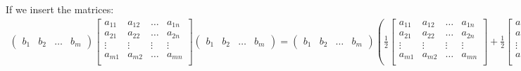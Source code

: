 \documentclass[12pt]{article}
\begin{document}
\begin{enumerate}
    If we insert the matrices:
    \begin{align*}
        \begin{pmatrix}
            b_1     &
            b_2     &
            \dots  &
            b_m
        \end{pmatrix} 
        \begin{bmatrix}
            a_{11}    &   a_{12}    & \dots     &   a_{1n}    \\
            a_{21}    &   a_{22}    & \dots     &   a_{2n}    \\
            \vdots    &  \vdots     & \vdots    &   \vdots    \\   
            a_{m1}    &   a_{m2}    & \dots     &   a_{mn}    \\
        \end{bmatrix}
        \begin{pmatrix}
            b_1     &
            b_2     &
            \dots  &
            b_m
        \end{pmatrix}
        = 
        \begin{pmatrix}
            b_1     &
            b_2     &
            \dots  &
            b_m
        \end{pmatrix} (\frac{1}{2} 
        \begin{bmatrix}
            a_{11}    &   a_{12}    & \dots     &   a_{1n}    \\
            a_{21}    &   a_{22}    & \dots     &   a_{2n}    \\
            \vdots    &  \vdots     & \vdots    &   \vdots    \\   
            a_{m1}    &   a_{m2}    & \dots     &   a_{mn}    \\
        \end{bmatrix}
         + \frac{1}{2}
        \begin{bmatrix}
            a_{11}    &   a_{21}    & \dots     &   a_{m1}    \\
            a_{12}    &   a_{22}    & \dots     &   a_{2n}    \\
            \vdots    &  \vdots     & \vdots    &   \vdots    \\   
            a_{1n}    &   a_{2n}    & \dots     &   a_{mn}    \\
        \end{bmatrix})
        \begin{pmatrix}
            b_1     &
            b_2     &
            \dots  &
            b_m
        \end{pmatrix}
    \end{align*}
    
\end{enumerate}    
\end{document}

